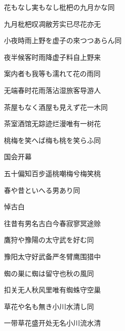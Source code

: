 \begin{haiku}
    {\FH 花もなし実もなし枇杷の九月かな}\hfill{\FH 同}

    {\FK 九月枇杷叹凋敝芳实已尽花亦无}
\end{haiku}

\begin{haiku}
    {\FH 小夜時雨上野を虚子の來つつあらん}\hfill{\FH 同}

    {\FK 夜半候客时雨降虚子料自上野来}
\end{haiku}

\begin{haiku}
    {\FH 案内者も我等も濡れて花の雨}\hfill{\FH 同}

    {\FK 无端春时花雨落沾湿旅客导游人}
\end{haiku}

\begin{haiku}
    {\FH 茶屋もなく酒屋も見えず花一木}\hfill{\FH 同}

    {\FK 茶室酒馆无踪迹烂漫唯有一树花}
\end{haiku}

\begin{haiku}
    {\FH 桃梅を笑へば梅も桃を笑らふ}\hfill{\FH 同}

    {\FK 国会开幕}

    {\FK 五十偏知百步遥桃嘲梅兮梅笑桃}
\end{haiku}

\begin{haiku}
    {\FH 春や昔といへる男あり}\hfill{\FH 同}

    {\FK 悼古白}

    {\FK 往昔有男名古白今春寂寥冥途赊}
\end{haiku}

\begin{haiku}
    {\FH 鷹狩や豫陽の太守武を好む}\hfill{\FH 同}

    {\FK 豫阳太守好武备严冬臂鹰围猎中}
\end{haiku}

\begin{haiku}
    {\FH 蜘の巣に蜘は留守也秋の風}\hfill{\FH 同}

    {\FK 扣关无人秋风里唯有蜘蛛守空巢}
\end{haiku}

\begin{haiku}
    {\FH 草花や名も無き小川水清し}\hfill{\FH 同}

    {\FK 一带草花盛开处无名小川流水清}
\end{haiku}

